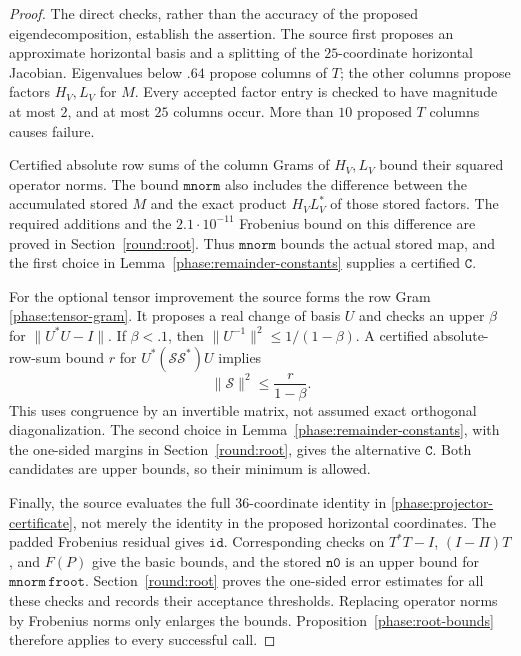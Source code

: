 \begin{proof}
The direct checks, rather than the accuracy of the proposed
eigendecomposition, establish the assertion.  The source first proposes
an approximate horizontal basis and a splitting of the \(25\)-coordinate
horizontal Jacobian.  Eigenvalues below \(.64\) propose columns of \(T\);
the other columns propose factors \(H_V,L_V\) for \(M\).
Every accepted factor entry is checked to have magnitude at most \(2\),
and at most \(25\) columns occur.  More than \(10\) proposed \(T\)
columns causes failure.

Certified absolute row sums of the column Grams of \(H_V,L_V\) bound
their squared operator norms.  The bound \(\mathtt{mnorm}\) also
includes the difference between the accumulated stored \(M\) and the
exact product \(H_VL_V^*\) of those stored factors.  The required
additions and the \(2.1\cdot10^{-11}\) Frobenius bound on this difference
are proved in Section~\ref{round:root}.  Thus \(\mathtt{mnorm}\) bounds
the actual stored map, and the first choice in
Lemma~\ref{phase:remainder-constants} supplies a certified \(\mathtt C\).

For the optional tensor improvement the source forms the row Gram
\eqref{phase:tensor-gram}.  It proposes a real change of basis \(U\) and
checks an upper \(\beta\) for \(\|U^*U-I\|\).  If \(\beta<.1\), then
\(\|U^{-1}\|^2\leq1/(1-\beta)\).  A certified absolute-row-sum bound
\(r\) for \(U^*(\mathcal S\mathcal S^*)U\) implies
\[
 \|\mathcal S\|^2
 \leq\frac{r}{1-\beta}.
\]
This uses congruence by an invertible matrix, not assumed exact
orthogonal diagonalization.  The second choice in
Lemma~\ref{phase:remainder-constants}, with the one-sided margins in
Section~\ref{round:root}, gives the alternative \(\mathtt C\).
Both candidates are upper bounds, so their minimum is allowed.

Finally, the source evaluates the full \(36\)-coordinate identity in
\eqref{phase:projector-certificate}, not merely the identity in the
proposed horizontal coordinates.  The padded Frobenius residual gives
\(\mathtt{id}\).  Corresponding checks on \(T^*T-I\), \((I-\Pi)T\),
and \(F(P)\) give the basic bounds, and the stored \(\mathtt{n0}\)
is an upper bound for \(\mathtt{mnorm}\,\mathtt{froot}\).
Section~\ref{round:root} proves the one-sided error estimates for all
these checks and records their acceptance thresholds.  Replacing
operator norms by Frobenius norms only enlarges the bounds.
Proposition~\ref{phase:root-bounds} therefore applies to every successful
call.
\end{proof}

